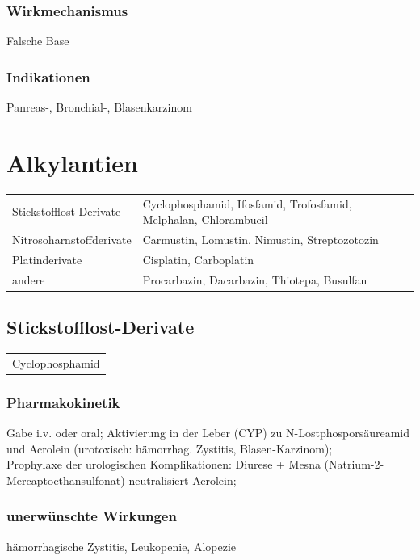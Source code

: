 \documentclass[10pt,a4paper]{report}
\begin{document}
\subsubsection{Wirkmechanismus} %
\label{ssub:wirkmechanismus}
Falsche Base
\subsubsection{Indikationen} %
\label{ssub:indikationen}
Panreas-, Bronchial-, Blasenkarzinom
\section{Alkylantien} %
\label{sec:alkylantien}
\begin{tabularx}{\textwidth}{XX}
Stickstofflost-Derivate&Cyclophosphamid, Ifosfamid, Trofosfamid, Melphalan, Chlorambucil\\
Nitrosoharnstoffderivate&Carmustin, Lomustin, Nimustin, Streptozotozin\\
Platinderivate&Cisplatin, Carboplatin\\
andere&Procarbazin, Dacarbazin, Thiotepa, Busulfan\\  
\end{tabularx}
\subsection{Stickstofflost-Derivate} %
\label{sub:stickstofflost_derivate}
\begin{tabularx}{\textwidth}{X}
  Cyclophosphamid\\
\end{tabularx}
\subsubsection{Pharmakokinetik} %
\label{par:pharmakokinetik}
Gabe i.v. oder oral; Aktivierung in der Leber (CYP) zu N-Lostphosporsäureamid und Acrolein (urotoxisch: hämorrhag. Zystitis, Blasen-Karzinom); \\
Prophylaxe der urologischen Komplikationen: Diurese + Mesna (Natrium-2-Mercaptoethansulfonat) neutralisiert Acrolein; 
\subsubsection{unerwünschte Wirkungen} %
\label{par:unerw_nschte_wirkungen}
hämorrhagische Zystitis, Leukopenie, Alopezie
\end{document}

